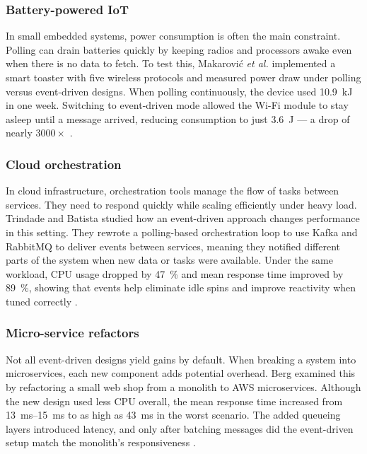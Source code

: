 \documentclass[nomenclature, english, biblatex]{kththesis}
\numberwithin{listing}{chapter}
\begin{document}
\subsubsection{Battery-powered IoT}
In small embedded systems, power consumption is often the main constraint. Polling can drain batteries quickly by keeping radios and processors awake even when there is no data to fetch. 
To test this, Makarović \textit{et al.} implemented a smart toaster with five wireless protocols and measured power draw under polling versus event-driven designs. When polling continuously, the device used \SI{10.9}{\kilo\joule} in one week. Switching to event-driven mode allowed the Wi-Fi module to stay asleep until a message arrived, reducing consumption to just \SI{3.6}{\joule} — a drop of nearly \(3000\times\) \cite{Makarovi2022EnergyEfficientIoT}.

\subsubsection{Cloud orchestration}
In cloud infrastructure, orchestration tools manage the flow of tasks between services. They need to respond quickly while scaling efficiently under heavy load.
Trindade and Batista studied how an event-driven approach changes performance in this setting. They rewrote a polling-based orchestration loop to use Kafka and RabbitMQ to deliver events between services, meaning they notified different parts of the system when new data or tasks were available. Under the same workload, CPU usage dropped by \SI{47}{\percent} and mean response time improved by \SI{89}{\percent}, showing that events help eliminate idle spins and improve reactivity when tuned correctly \cite{Trindade2021EDAImpact}.

\subsubsection{Micro-service refactors}
Not all event-driven designs yield gains by default. When breaking a system into microservices, each new component adds potential overhead. 
Berg examined this by refactoring a small web shop from a monolith to AWS microservices. Although the new design used less CPU overall, the mean response time increased from \SIrange{13}{15}{\milli\second} to as high as \SI{43}{\milli\second} in the worst scenario. The added queueing layers introduced latency, and only after batching messages did the event-driven setup match the monolith's responsiveness \cite{Berg2022MonolithVsMicroservices}.
\end{document}

